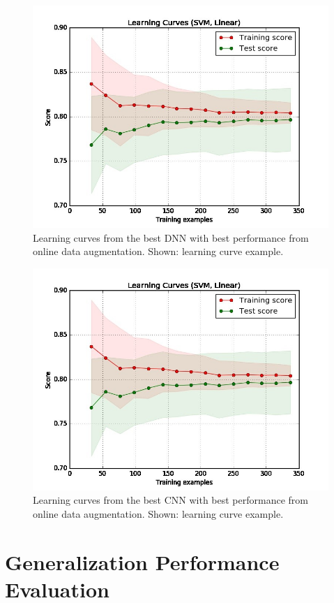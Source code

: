 \begin{figure}[H]
	\centering
	\includegraphics[width=0.8\linewidth]{model_choice_hyperparameter_search_images/learning_curve_dummy}
	\caption{Learning curves from the best DNN with best performance from online data augmentation. Shown: learning curve example.}
	\label{fig:learning_curves}
\end{figure}



\begin{figure}[H]
	\centering
	\includegraphics[width=0.8\linewidth]{model_choice_hyperparameter_search_images/learning_curve_dummy}
	\caption{Learning curves from the best CNN with best performance from online data augmentation. Shown: learning curve example.}
	\label{fig:learning_curves}
\end{figure}


\section{Generalization Performance Evaluation}

